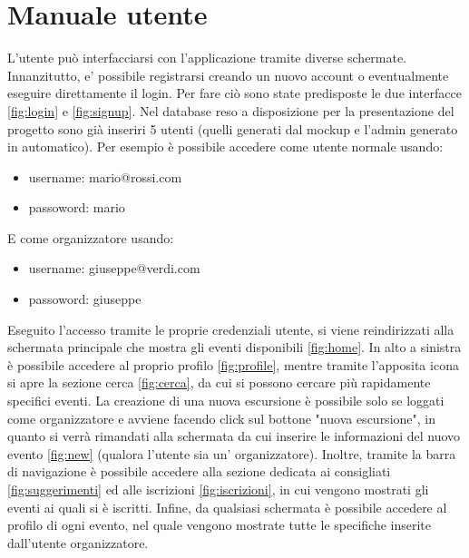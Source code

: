 \section{Manuale utente}
L'utente può interfacciarsi con l'applicazione tramite diverse schermate. Innanzitutto, e' possibile registrarsi creando un nuovo account o eventualmente eseguire direttamente il login. Per fare ciò sono state predisposte le due interfacce \ref{fig:login} e \ref{fig:signup}. Nel database reso a disposizione per la presentazione del progetto sono già inseriri 5 utenti (quelli generati dal mockup e l'admin generato in automatico). Per esempio è possibile accedere come utente normale usando:
\begin{itemize}
    \item username: mario@rossi.com
    \item passoword: mario
\end{itemize}
E come organizzatore usando:
\begin{itemize}
    \item username: giuseppe@verdi.com
    \item passoword: giuseppe
\end{itemize}
Eseguito l'accesso tramite le proprie credenziali utente, si viene reindirizzati alla schermata principale che mostra gli eventi disponibili \ref{fig:home}. In alto a sinistra è possibile accedere al proprio profilo \ref{fig:profile}, mentre tramite l'apposita icona si apre la sezione cerca \ref{fig:cerca}, da cui si possono cercare più rapidamente specifici eventi. La creazione di una nuova escursione è possibile solo se loggati come organizzatore e avviene facendo click sul bottone "nuova escursione", in quanto si verrà rimandati alla schermata  da cui inserire le informazioni del nuovo evento \ref{fig:new} (qualora l'utente sia un' organizzatore). Inoltre, tramite la barra di navigazione è possibile accedere alla sezione dedicata ai consigliati \ref{fig:suggerimenti} ed alle iscrizioni \ref{fig:iscrizioni}, in cui vengono mostrati gli eventi ai quali si è iscritti. Infine, da qualsiasi schermata è possibile accedere al profilo di ogni evento, nel quale vengono mostrate tutte le specifiche inserite
dall'utente organizzatore.
